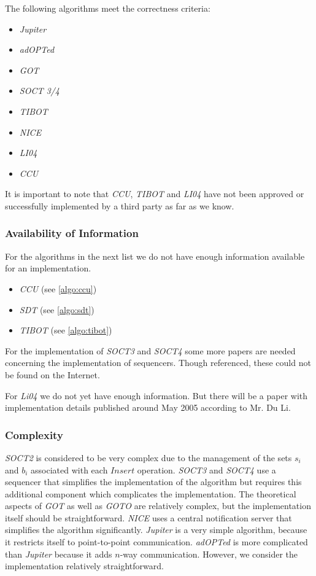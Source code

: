 
The following algorithms meet the correctness criteria:
\begin{itemize}
 \item \emph{Jupiter}
 \item \emph{adOPTed}
 \item \emph{GOT}
 \item \emph{SOCT 3/4}
 \item \emph{TIBOT}
 \item \emph{NICE}
 \item \emph{LI04}
 \item \emph{CCU}
\end{itemize}

It is important to note that \emph{CCU}, \emph{TIBOT} and \emph{LI04} have not been approved or successfully implemented by a third party as far as we know.


\subsubsection{Availability of Information}
For the algorithms in the next list we do not have enough information available for an implementation.

\begin{itemize}
 \item \emph{CCU} (see \ref{algo:ccu})
 \item \emph{SDT} (see \ref{algo:sdt})
 \item \emph{TIBOT} (see \ref{algo:tibot})
\end{itemize}

For the implementation of \emph{SOCT3} and \emph{SOCT4} some more papers are needed concerning the implementation of sequencers. Though referenced, these could not be found on the Internet. 

For \emph{Li04} we do not yet have enough information. But there will be a paper with implementation details published around May 2005 according to Mr. Du Li.


\subsubsection{Complexity}
\emph{SOCT2} is considered to be very complex \cite{imine03b} \cite{sdt} due to the management of the sets $s_i$ and $b_i$ associated with each $Insert$ operation. \emph{SOCT3} and \emph{SOCT4} use a sequencer that simplifies the implementation of the algorithm but requires this additional component which complicates the implementation. The theoretical aspects of \emph{GOT} as well as \emph{GOTO} are relatively complex, but the implementation itself should be straightforward. \emph{NICE} uses a central notification server that simplifies the algorithm significantly. \emph{Jupiter} is a very simple algorithm, because it restricts itself to point-to-point communication. \emph{adOPTed} is more complicated than \emph{Jupiter} because it adds $n$-way communication. However, we consider the implementation relatively straightforward.  

